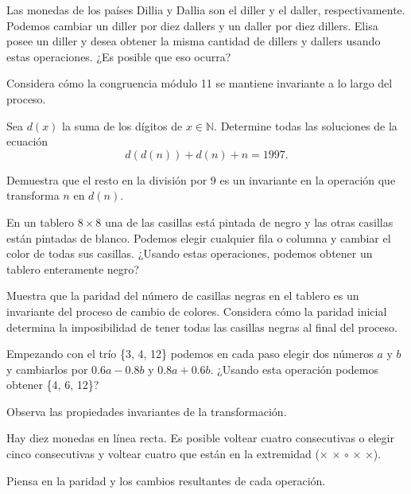\documentclass[11pt]{scrartcl}
\begin{document}
\begin{problem}[Leningrado 1987] Las monedas de los países Dillia y Dallia son el diller y el daller, respectivamente. Podemos cambiar un diller por diez dallers y un daller por diez dillers. Elisa posee un diller y desea obtener la misma cantidad de dillers y dallers usando estas operaciones. ¿Es posible que eso ocurra?
\begin{hint}
    Considera cómo la congruencia módulo 11 se mantiene invariante a lo largo del proceso.
\end{hint}
\end{problem}

\begin{problem}
Sea \(d(x)\) la suma de los dígitos de \(x \in \mathbb{N}\). Determine todas las soluciones de la ecuación
\[ d(d(n)) + d(n) + n = 1997. \]
\begin{hint}
    Demuestra que el resto en la división por 9 es un invariante en la operación que transforma \(n\) en \(d(n)\).
\end{hint}
\end{problem}

\begin{problem}
En un tablero \(8 \times 8\) una de las casillas está pintada de negro y las otras casillas están pintadas de blanco. Podemos elegir cualquier fila o columna y cambiar el color de todas sus casillas. ¿Usando estas operaciones, podemos obtener un tablero enteramente negro?
\begin{hint}
    Muestra que la paridad del número de casillas negras en el tablero es un invariante del proceso de cambio de colores. Considera cómo la paridad inicial determina la imposibilidad de tener todas las casillas negras al final del proceso.
\end{hint}
\end{problem}

\begin{problem}
Empezando con el trío \{3, 4, 12\} podemos en cada paso elegir dos números \( a \) y \( b \) y cambiarlos por \( 0.6a - 0.8b \) y \( 0.8a + 0.6b \). ¿Usando esta operación podemos obtener \{4, 6, 12\}?
\begin{hint}
Observa las propiedades invariantes de la transformación.
\end{hint}
\end{problem}

\begin{problem} Hay diez monedas en línea recta. Es posible voltear cuatro consecutivas o elegir cinco consecutivas y voltear cuatro que están en la extremidad (× × \(\circ\) × ×).
\begin{hint}
Piensa en la paridad y los cambios resultantes de cada operación.
\end{hint}
\end{problem}
\end{document}
